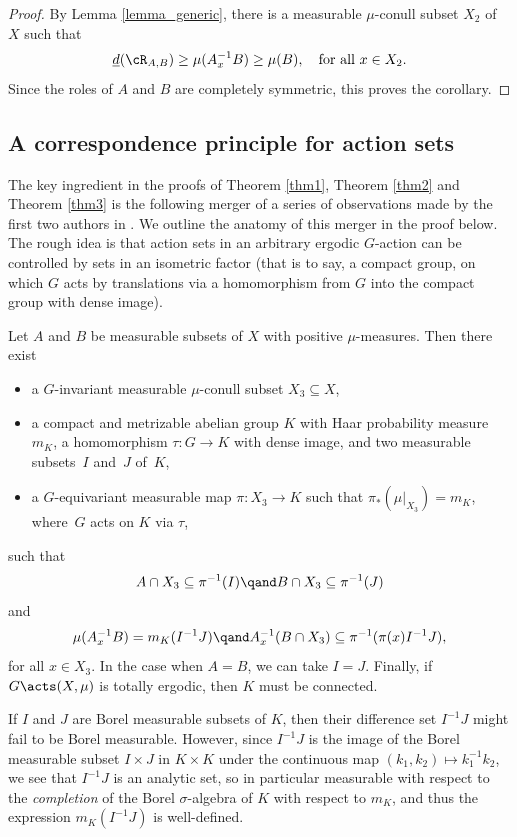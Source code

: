 \begin{proof}
By Lemma \ref{lemma_generic}, there is a measurable $\mu$-conull subset $X_2$ of $X$ such that
\[
\underline{d}(\cR_{A,B}) \geq \mu(A_x^{-1}B) \geq \mu(B), \quad \textrm{for all $x \in X_2$}.
\]
Since the roles of $A$ and $B$ are completely symmetric, this proves the corollary.
\end{proof}

\subsection{A correspondence principle for action sets}

The key ingredient in the proofs of Theorem \ref{thm1}, Theorem \ref{thm2} and Theorem \ref{thm3} is the following merger of a series of
observations made by the first two authors in \cite{BF}. We outline the anatomy of this merger in the proof below. The rough idea is that
action sets in an arbitrary ergodic $G$-action can be controlled by sets in an isometric factor (that is to say, a compact group, on which $G$
acts by translations via a homomorphism from $G$ into the compact group with dense image).

\begin{lemma}
\label{corrprinciple}
Let $A$ and $B$ be measurable subsets of $X$ with positive $\mu$-measures. Then there exist

\begin{itemize}
\item a $G$-invariant measurable $\mu$-conull subset $X_3 \subseteq X$,
\item a compact and metrizable abelian group $K$ with Haar probability measure $m_K$, a homomorphism $\tau : G \to K$ with dense image,
and two measurable subsets~$I$ and~$J$ of~$K$,
\item a $G$-equivariant measurable map $\pi : X_3 \to K$ such that $\pi_*(\mu |_{X_3}) = m_K$, where~$G$ acts on $K$ via $\tau$,
\end{itemize}
such that
\[
A \cap X_3 \subseteq \pi^{-1}(I) \qand B \cap X_3 \subseteq \pi^{-1}(J)
\]
and
\[
\mu(A_x^{-1}B) = m_K(I^{-1}J)
\qand
A_x^{-1}(B \cap X_3) \subseteq \pi^{-1}(\pi(x) I^{-1}J),
\]
for all $x \in X_3$. In the case when $A = B$, we can take $I = J$. Finally, if $G \acts (X,\mu)$ is totally ergodic, then $K$ must be connected.
\end{lemma}

\begin{remark}
If $I$ and $J$ are Borel measurable subsets of $K$, then their difference set $I^{-1}J$ might fail to be Borel measurable. However, since
$I^{-1}J$ is the image of the Borel measurable subset $I \times J$ in $K \times K$ under the continuous map $(k_1,k_2) \mapsto k_1^{-1}k_2$,
we see that $I^{-1}J$ is an analytic set, so in particular measurable with respect to the \emph{completion} of the Borel $\sigma$-algebra of $K$ with
respect to $m_K$, and thus the expression $m_K(I^{-1}J)$ is well-defined.
\end{remark}


